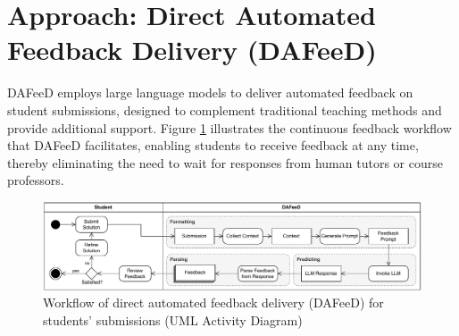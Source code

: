 \documentclass[manuscript,screen,review]{acmart}
\begin{document}
%


%


%


%



\newpage
\section{Approach: Direct Automated Feedback Delivery (DAFeeD)} %
\label{sec:approach:DAFeeD}

DAFeeD employs large language models to deliver automated feedback on student submissions, designed to complement traditional teaching methods and provide additional support.
Figure \ref{fig:DAFeeD-workflow} illustrates the continuous feedback workflow that DAFeeD facilitates, enabling students to receive feedback at any time, thereby eliminating the need to wait for responses from human tutors or course professors.

\begin{figure}[htbp]
  \centering
  \includegraphics[width=\linewidth]{figures/DAFeeD-ActivityDiagram_alternative.pdf}
  \caption{Workflow of direct automated feedback delivery (DAFeeD) for students' submissions (UML Activity Diagram)}
  \label{fig:DAFeeD-workflow}
\end{figure}
\end{document}
